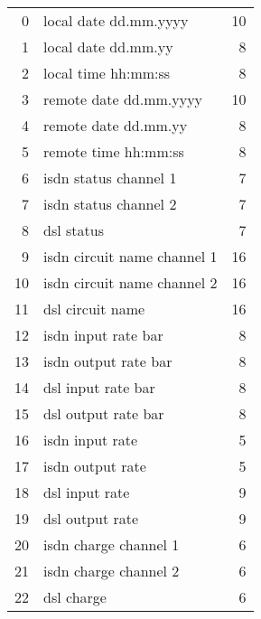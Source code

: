 \begin{description}
\begin{table}[htbp]
\begin{small}
\begin{center}
\begin{tabular}{rlr}
                0 &       local date dd.mm.yyyy           & 10 \\
                1 &       local date dd.mm.yy             &  8 \\
                2 &       local time hh:mm:ss             &  8 \\

                3 &       remote date dd.mm.yyyy          & 10 \\
                4 &       remote date dd.mm.yy            &  8 \\
                5 &       remote time hh:mm:ss            &  8 \\

                6 &       isdn status channel 1           &  7 \\
                7 &       isdn status channel 2           &  7 \\
                8 &       dsl status                      &  7 \\

                9 &       isdn circuit name channel 1     & 16 \\
                10 &      isdn circuit name channel 2     & 16 \\
                11 &      dsl circuit name                & 16 \\

                12 &      isdn input rate bar             &  8 \\
                13 &      isdn output rate bar            &  8 \\
                14 &      dsl input rate bar              &  8 \\
                15 &      dsl output rate bar             &  8 \\

                16 &      isdn input rate                 &  5 \\
                17 &      isdn output rate                &  5 \\
                18 &      dsl input rate                  &  9 \\
                19 &      dsl output rate                 &  9 \\

                20 &      isdn charge channel 1           &  6 \\
                21 &      isdn charge channel 2           &  6 \\
                22 &      dsl charge                      &  6 \\


\end{tabular}
\end{center}
\end{small}
\end{table}
\end{description}
